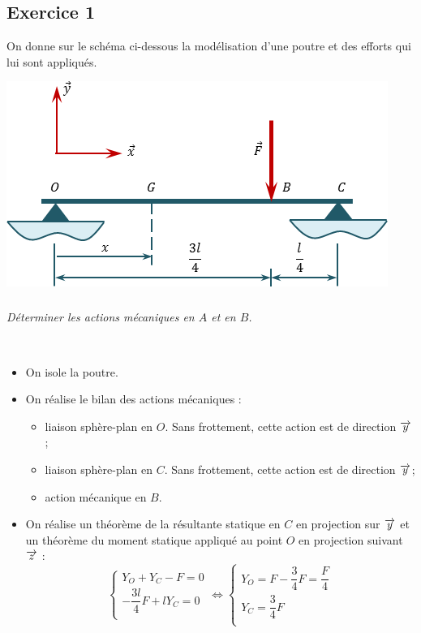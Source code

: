\documentclass[10pt,fleqn]{article} %
\begin{document}
\begin{multicols}{1}





\newpage



\section*{Exercice 1}
\setcounter{subparagraph}{0}
On donne sur le schéma ci-dessous la modélisation d'une poutre et des efforts qui lui sont appliqués.
\begin{center}
\includegraphics[width=.45\textwidth]{images/exo_01}
\end{center}

\subparagraph{}
\textit{Déterminer les actions mécaniques en $A$ et en $B$.}
\ifprof
\begin{corrige}~\\

\begin{itemize}[label=,font=\color{ocre}] 
\item On isole la poutre.
\item On réalise le bilan des actions mécaniques :
\begin{itemize}[label=,font=\color{ocre} \footnotesize] 
\item liaison sphère-plan en $O$. Sans frottement, cette action est de direction $\overrightarrow{y}$;
\item liaison sphère-plan en $C$. Sans frottement, cette action est de direction $\overrightarrow{y}$;
\item action mécanique en $B$.
\end{itemize}
\item On réalise un théorème de la résultante statique en $C$ en projection sur $\overrightarrow{y}$ et un théorème du moment statique appliqué au point $O$ en projection suivant $\overrightarrow{z}$ :
$$
\left\{
\begin{array}{l}
Y_O + Y_C -F = 0 \\
-\dfrac{3l}{4}F + l Y_C = 0 \\
\end{array}
\right.
\Leftrightarrow
\left\{
\begin{array}{l}
Y_O = F -  \dfrac{3}{4}F  = \dfrac{F}{4} \\
Y_C = \dfrac{3}{4}F \\
\end{array}
\right.
$$
\end{itemize}


\end{corrige}
\end{multicols}
\end{document}
